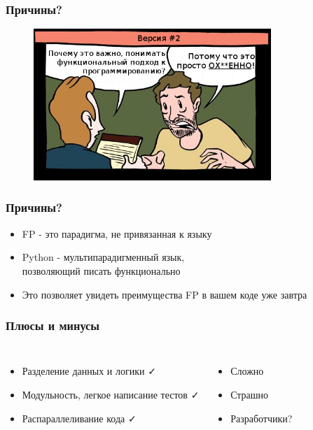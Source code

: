 \documentclass[18pt, compress, aspectratio=169]{beamer}
\def\check{\textcolor{check}{\FA \faCheck}}
\def\fail{\textcolor{fail}{\FA \faRemove}}
\begin{document}
\begin{frame}
    \frametitle{Причины?}
    \vspace{-25pt}
    \begin{figure}
        \includegraphics[width=0.8\textwidth,center]{second_option.png}
    \end{figure}
\end{frame}

\begin{frame}[fragile]
    \frametitle{Причины?}
    \begin{itemize}[label={\MVRightarrow}]
        \item FP - это парадигма, не привязанная к языку
        \item Python - мультипарадигменный язык,\\ позволяющий писать функционально
        \item Это позволяет увидеть преимущества FP в вашем коде уже завтра
    \end{itemize}
\end{frame}

\begin{frame}
    \frametitle{Плюсы и минусы}
    \vspace{-20pt}
    \begin{columns}[T,onlytextwidth]
        \begin{itemize}[label={\MVRightarrow}]
            \item <+->Разделение данных и логики \check
            \item <+->Модульность, легкое написание тестов \check
            \item <+->Распараллеливание кода \check
        \end{itemize}

        \begin{itemize}[label={\MVRightarrow}]
            \item <+->Сложно \fail
            \item <+->Страшно \fail
            \item <+->Разработчики? \fail
        \end{itemize}
    \end{columns}
\end{frame}
\end{document}
